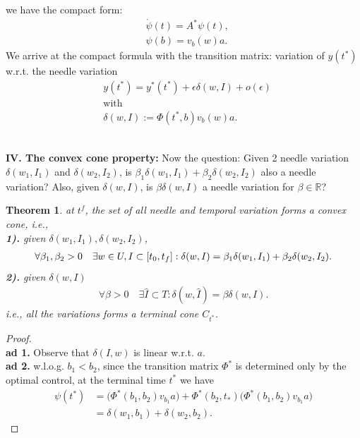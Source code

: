 \documentclass[a4paper,11pt,fleqn]{book}
\newtheorem{theorem}{Theorem}[section]
\theoremstyle{definition}
\theoremstyle{remark}
\let\ran\relax
\DeclareMathOperator{\ran}{ran}
\begin{document}
we have the compact form:
\begin{equation}
\begin{aligned}
	&\dot{\psi}(t) = A^* \psi(t),\\
	&\psi(b) = v_b(w)a.
\end{aligned}
\end{equation}
We arrive at the compact formula with the transition matrix: variation of $y(t^*)$ w.r.t. the needle variation
\begin{equation}\label{needle variation}
\begin{aligned}
	& y(t^*) = y^*(t^*) + \epsilon \delta(w, I) + o(\epsilon)\\
	& \text{with}\\
	& \delta(w, I):= \Phi(t^*, b)v_b(w) a. 
\end{aligned}
\end{equation}

\quad\\
\textbf{IV. The convex cone property:}
Now the question: Given 2 needle variation $\delta(w_1, I_1)$ and $\delta(w_2, I_2)$, is $\beta_1 \delta(w_1, I_1) + \beta_2 \delta(w_2, I_2)$ also a needle variation? Also, given $\delta(w, I)$, is $\beta \delta(w, I)$ a needle variation for $\beta \in \mathbb{R}$?


\begin{theorem}
	at $t^f$, the set of all needle and temporal variation forms a convex cone, i.e., \\
	\textbf{1).}  given $\delta(w_1, I_1), \delta(w_2, I_2)$, 
	\begin{align*}
		\forall \beta_1, \beta_2 > 0 \quad \exists w \in \ran U, I \subset [t_0, t_f]: \delta(w, I) = \beta_1 \delta(w_1, I_1) + \beta_2 \delta (w_2, I_2). 
	\end{align*}
	\textbf{2).} given $\delta(w, I)$
	\begin{align*}
		\forall \beta >0  \quad \exists \hat{I} \subset T: \delta(w, \hat{I}) = \beta \delta(w, I). 
	\end{align*}
	i.e., all the variations forms a terminal cone $C_{t^*}$. 
\end{theorem}
\begin{proof}\qquad\\
\textbf{ad 1.} Observe that $\delta(I, w)$ is linear w.r.t. $a$.\\
\textbf{ad 2.} w.l.o.g. $b_1 < b_2$, since the transition matrix $\Phi^*$ is determined only by the optimal control, at the terminal time $t^*$ we have 
\begin{align*}
	\psi(t^*) &=   \bigg( \Phi^*(b_1, b_2)v_{b_1} a \bigg) + \Phi^*(b_2, t_*) \bigg(\Phi^*(b_1, b_2)v_{b_1} a  \bigg)\\
	& = \delta(w_1, b_1) + \delta(w_2, b_2). 
\end{align*}
\end{proof}
\end{document}
